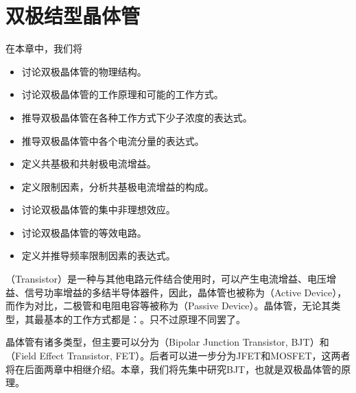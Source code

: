 \chapter{双极结型晶体管}

在本章中，我们将
\begin{itemize}
    \item 讨论双极晶体管的物理结构。
    \item 讨论双极晶体管的工作原理和可能的工作方式。
    \item 推导双极晶体管在各种工作方式下少子浓度的表达式。
    \item 推导双极晶体管中各个电流分量的表达式。
    \item 定义共基极和共射极电流增益。
    \item 定义限制因素，分析共基极电流增益的构成。
    \item 讨论双极晶体管的集中非理想效应。
    \item 讨论双极晶体管的等效电路。
    \item 定义并推导频率限制因素的表达式。
\end{itemize}

（Transistor）是一种与其他电路元件结合使用时，可以产生电流增益、电压增益、信号功率增益的多结半导体器件，因此，晶体管也被称为（Active Device），而作为对比，二极管和电阻电容等被称为（Passive Device）。晶体管，无论其类型，其最基本的工作方式都是：。只不过原理不同罢了。

晶体管有诸多类型，但主要可以分为（Bipolar Junction Transistor, BJT）和（Field Effect Transistor, FET）。后者可以进一步分为JFET和MOSFET，这两者将在后面两章中相继介绍。本章，我们将先集中研究BJT，也就是双极晶体管的原理。




